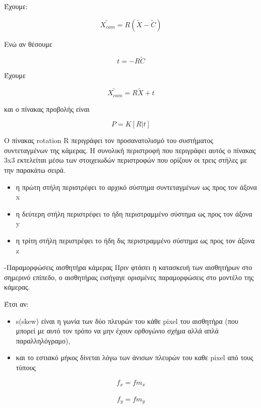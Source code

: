 Έχουμε:

\begin{equation}
\tilde{X_{cam}}=R(\tilde{X}-\tilde{C})
\end{equation}

Ενώ αν θέσουμε 


\begin{equation}
t=-R\tilde{C}
\end{equation}


Έχουμε 

\begin{equation}
\tilde{X_{cam}}=R\tilde{X}+t
\end{equation}


και ο πίνακας προβολής είναι

\begin{equation}
P=K[R|t]
\end{equation}


Ο πίνακας rotation R περιγράφει τον προσανατολισμό του συστήματος συντεταγμένων της κάμερας. Η συνολική περιστροφή που περιγράφει αυτός ο πίνακας 3x3 εκτελείται μέσω των στοιχειωδών περιστροφών που ορίζουν οι τρεις στήλες με την παρακάτω σειρά.


\begin{itemize}
\item η πρώτη στήλη περιστρέφει το αρχικό σύστημα συντεταγμένων ως προς τον άξονα x
\item η δεύτερη στήλη περιστρέφει το ήδη περιστραμμένο σύστημα ως προς τον άξονα  y
\item η τρίτη στήλη περιστρέφει το ήδη δις περιστραμμένο σύστημα ως προς τον άξονα  z 
\end{itemize}



-Παραμορφώσεις αισθητήρα κάμερας
Πριν φτάσει η κατασκευή των αισθητήρων στο σημερινό επίπεδο, ο αισθητήρας εισήγαγε ορισμένες παραμορφώσεις στο μοντέλο της κάμερας.

Έτσι αν:

\begin{itemize}
\item s(skew) είναι η γωνία των δύο πλευρών του κάθε pixel του αισθητήρα (που
μπορεί με αυτό τον τρόπο να μην έχουν ορθογώνιο σχήμα αλλά απλά παραλληλόγραμο),
\item και το εστιακό μήκος δίνεται λόγω των άνισων πλευρών του καθε pixel από τους τύπους
\end{itemize}


\begin{equation}
f_{x}=fm_{x}
\end{equation}
\\
\begin{equation}
f_{y}=fm_{y}
\end{equation}

